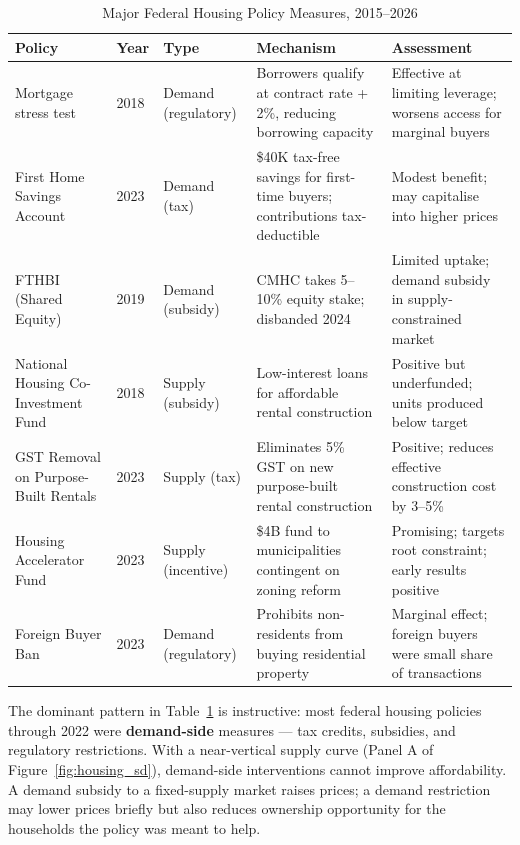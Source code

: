 \begin{table}[H]
\centering
\caption{Major Federal Housing Policy Measures, 2015--2026}
\label{tab:housing_policies}
\renewcommand{\arraystretch}{1.30}
\begin{tabular}{p{3.3cm}p{1.0cm}p{2.0cm}p{4.6cm}p{2.6cm}}
\toprule
\textbf{Policy} & \textbf{Year} & \textbf{Type} & \textbf{Mechanism}
                & \textbf{Assessment} \\
\midrule
Mortgage stress test
  & 2018 & Demand (regulatory)
  & Borrowers qualify at contract rate + 2\%, reducing borrowing capacity
  & Effective at limiting leverage; worsens access for marginal buyers \\
\addlinespace
First Home Savings Account
  & 2023 & Demand (tax)
  & \$40K tax-free savings for first-time buyers; contributions tax-deductible
  & Modest benefit; may capitalise into higher prices \\
\addlinespace
FTHBI (Shared Equity)
  & 2019 & Demand (subsidy)
  & CMHC takes 5--10\% equity stake; disbanded 2024
  & Limited uptake; demand subsidy in supply-constrained market \\
\addlinespace
National Housing Co-Investment Fund
  & 2018 & Supply (subsidy)
  & Low-interest loans for affordable rental construction
  & Positive but underfunded; units produced below target \\
\addlinespace
GST Removal on Purpose-Built Rentals
  & 2023 & Supply (tax)
  & Eliminates 5\% GST on new purpose-built rental construction
  & Positive; reduces effective construction cost by 3--5\% \\
\addlinespace
Housing Accelerator Fund
  & 2023 & Supply (incentive)
  & \$4B fund to municipalities contingent on zoning reform
  & Promising; targets root constraint; early results positive \\
\addlinespace
Foreign Buyer Ban
  & 2023 & Demand (regulatory)
  & Prohibits non-residents from buying residential property
  & Marginal effect; foreign buyers were small share of transactions \\
\bottomrule
\end{tabular}
\end{table}

The dominant pattern in Table~\ref{tab:housing_policies} is instructive:
most federal housing policies through 2022 were \textbf{demand-side}
measures --- tax credits, subsidies, and regulatory restrictions. With a
near-vertical supply curve (Panel A of Figure~\ref{fig:housing_sd}),
demand-side interventions cannot improve affordability. A demand subsidy
to a fixed-supply market raises prices; a demand restriction may lower
prices briefly but also reduces ownership opportunity for the households
the policy was meant to help.

